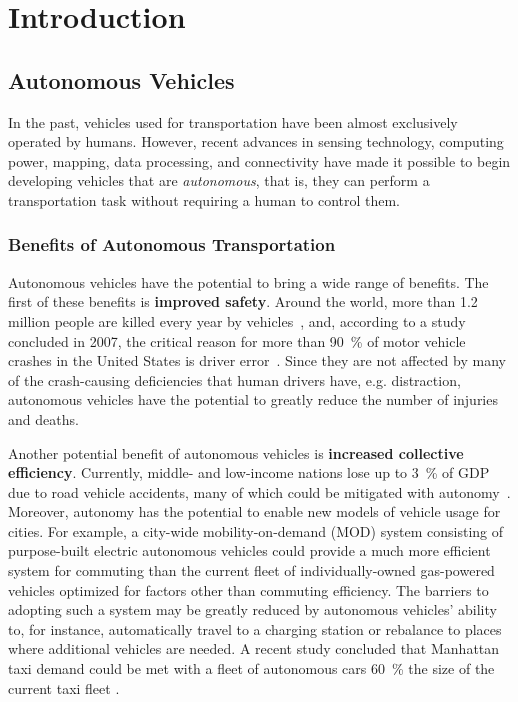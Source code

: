 \chapter{Introduction}

\section{Autonomous Vehicles}

In the past, vehicles used for transportation have been almost exclusively operated by humans.
However, recent advances in sensing technology, computing power, mapping, data processing, and connectivity have made it possible to begin developing vehicles that are \emph{autonomous}, that is, they can perform a transportation task without requiring a human to control them.

\subsection{Benefits of Autonomous Transportation} \label{sec:benefits}

Autonomous vehicles have the potential to bring a wide range of benefits.
The first of these benefits is \textbf{improved safety}.
Around the world, more than 1.2 million people are killed every year by vehicles~\cite{who2015global}, and, according to a study concluded in 2007, the critical reason for more than \SI{90}{\percent} of motor vehicle crashes in the United States is driver error~\cite{nhtsa2015critical}.
Since they are not affected by many of the crash-causing deficiencies that human drivers have, e.g. distraction, autonomous vehicles have the potential to greatly reduce the number of injuries and deaths.

Another potential benefit of autonomous vehicles is \textbf{increased collective efficiency}.
Currently, middle- and low-income nations lose up to \SI{3}{\percent} of GDP due to road vehicle accidents, many of which could be mitigated with autonomy~\cite{who2015global}.
Moreover, autonomy has the potential to enable new models of vehicle usage for cities.
For example, a city-wide mobility-on-demand (MOD) system consisting of purpose-built electric autonomous vehicles could provide a much more efficient system for commuting than the current fleet of individually-owned gas-powered vehicles optimized for factors other than commuting efficiency.
The barriers to adopting such a system may be greatly reduced by autonomous vehicles' ability to, for instance, automatically travel to a charging station or rebalance to places where additional vehicles are needed.
A recent study concluded that Manhattan taxi demand could be met with a fleet of autonomous cars \SI{60}{\percent} the size of the current taxi fleet \cite{RZ-MP:15_MODa}.

